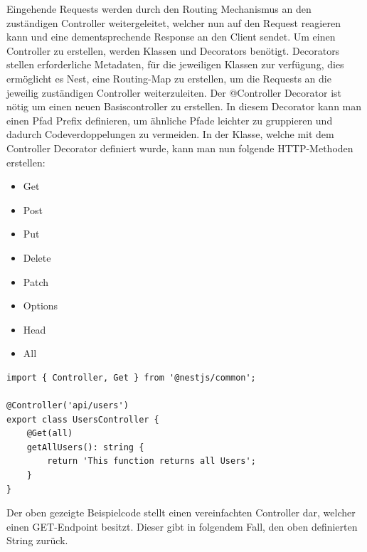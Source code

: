 Eingehende Requests werden durch den Routing Mechanismus an den zuständigen Controller weitergeleitet, welcher nun auf den Request reagieren kann und eine dementsprechende Response an den Client sendet. Um einen Controller zu erstellen, werden Klassen und Decorators benötigt. Decorators stellen erforderliche Metadaten, für die jeweiligen Klassen zur verfügung, dies ermöglicht es Nest, eine Routing-Map zu erstellen, um die Requests an die jeweilig zuständigen Controller weiterzuleiten.
\newline
Der @Controller Decorator ist nötig um einen neuen Basiscontroller zu erstellen. In diesem Decorator kann man einen Pfad Prefix definieren, um ähnliche Pfade leichter zu gruppieren und dadurch Codeverdoppelungen zu vermeiden. In der Klasse, welche mit dem Controller Decorator definiert wurde, kann man nun folgende HTTP-Methoden erstellen:

\begin{itemize}
    \item Get
    \item Post
    \item Put
    \item Delete
    \item Patch
    \item Options
    \item Head
    \item All
\end{itemize}

\vspace{10mm}

\begin{lstlisting}
import { Controller, Get } from '@nestjs/common';

@Controller('api/users')
export class UsersController {
    @Get(all)
    getAllUsers(): string {
        return 'This function returns all Users';
    }
}
\end{lstlisting}

Der oben gezeigte Beispielcode stellt einen vereinfachten Controller dar, welcher einen GET-Endpoint besitzt. Dieser gibt in folgendem Fall, den oben definierten String zurück.
\cite{Nest_js_Controllers}


